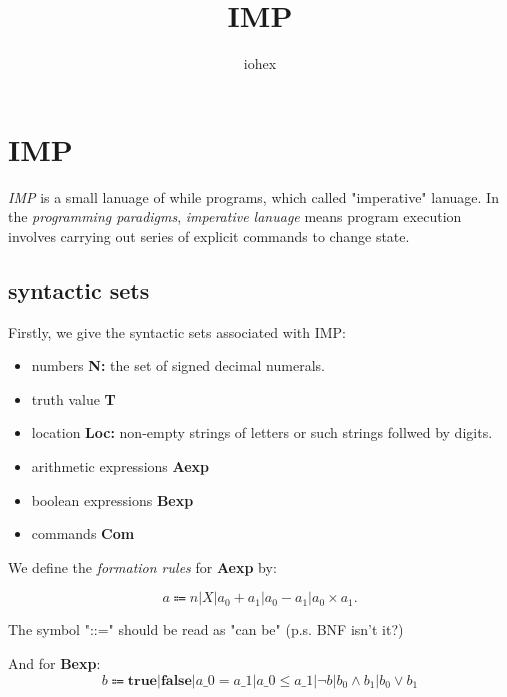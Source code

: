 \documentclass[a4paper, 12pt]{article}
\begin{document}
    \title{IMP}
    \author{iohex}
\section{IMP}
    \emph{IMP} is a small lanuage of while programs, which called "imperative" lanuage.
    In the \emph{programming paradigms}, \emph{imperative lanuage} means program execution involves carrying out series of explicit commands to change state.

    \subsection*{syntactic sets}
    Firstly, we give the syntactic sets associated with IMP:

        \begin{itemize}
            \item numbers \textbf{N:} the set of signed decimal numerals.
            \item truth value \textbf{T}
            \item location \textbf{Loc:} non-empty strings of letters or such strings follwed by digits.
            \item arithmetic expressions \textbf{Aexp}
            \item boolean expressions \textbf{Bexp}
            \item commands \textbf{Com}
        \end{itemize}
    
    We define the \emph{formation rules} for \textbf{Aexp} by:

    \[
        a \Coloneqq n | X | a_0+a_1|a_0-a_1|a_0 \times a_1.
    \]

    The symbol "::=" should be read as "can be" (p.s. BNF isn't it?)

    And for \textbf{Bexp}:
    \[
        b \Coloneqq \textbf{true} | \textbf{false} | a\_0 = a\_1 | a\_0 \leq a\_1 | \neg b | b_0 \wedge b_1 | b_0 \lor b_1
    \]
\end{document}

